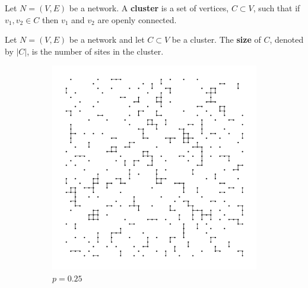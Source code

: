 \begin{definition}\label{def:cluster}
  Let $N=(V, E)$ be a network. A \textbf{cluster} is a set of vertices, $C \subset V$, such that if $v_1, v_2 \in C$ then $v_1$ and $v_2$ are openly connected.
\end{definition}

\begin{definition}\label{def:cluster size}
  Let $N=(V, E)$ be a network and let $C \subset V$ be a cluster. The \textbf{size} of $C$, denoted by $|C|$, is the number of sites in the cluster.
\end{definition}

\begin{figure}[p]
  \centering
  \begin{subfigure}[b]{0.45\textwidth}
    \centering
    \includegraphics[width=\textwidth]{1/percolation1}
    \caption{$p=0.25$}
    \label{fig:p=0.25}
  \end{subfigure}
  \hfill
  \begin{subfigure}[b]{0.45\textwidth}
    \centering

\end{subfigure}
\end{figure}

